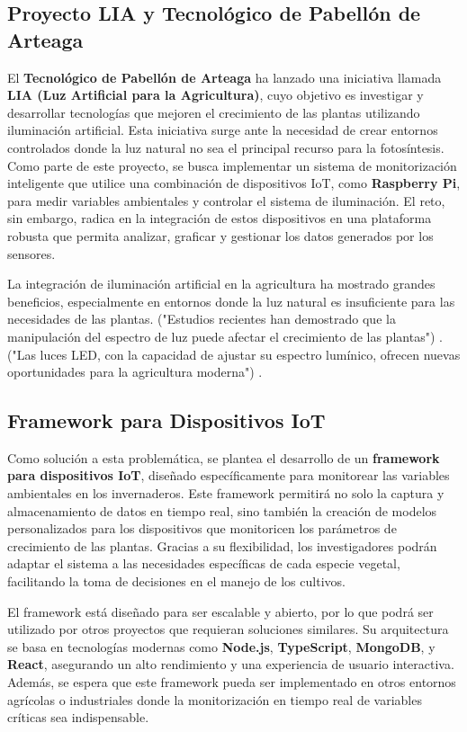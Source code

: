 \subsection{Proyecto LIA y Tecnológico de Pabellón de Arteaga}
El \textbf{Tecnológico de Pabellón de Arteaga} ha lanzado una iniciativa llamada \textbf{LIA (Luz Artificial para la Agricultura)}, cuyo objetivo es investigar y desarrollar tecnologías que mejoren el crecimiento de las plantas utilizando iluminación artificial. Esta iniciativa surge ante la necesidad de crear entornos controlados donde la luz natural no sea el principal recurso para la fotosíntesis. Como parte de este proyecto, se busca implementar un sistema de monitorización inteligente que utilice una combinación de dispositivos IoT, como \textbf{Raspberry Pi}, para medir variables ambientales y controlar el sistema de iluminación. El reto, sin embargo, radica en la integración de estos dispositivos en una plataforma robusta que permita analizar, graficar y gestionar los datos generados por los sensores.

La integración de iluminación artificial en la agricultura ha mostrado grandes beneficios, especialmente en entornos donde la luz natural es insuficiente para las necesidades de las plantas. ("Estudios recientes han demostrado que la manipulación del espectro de luz puede afectar el crecimiento de las plantas") \cite{gonzalez2019, zhang2021}. ("Las luces LED, con la capacidad de ajustar su espectro lumínico, ofrecen nuevas oportunidades para la agricultura moderna") \cite{zhang2021}.

\subsection{Framework para Dispositivos IoT}
Como solución a esta problemática, se plantea el desarrollo de un \textbf{framework para dispositivos IoT}, diseñado específicamente para monitorear las variables ambientales en los invernaderos. Este framework permitirá no solo la captura y almacenamiento de datos en tiempo real, sino también la creación de modelos personalizados para los dispositivos que monitoricen los parámetros de crecimiento de las plantas. Gracias a su flexibilidad, los investigadores podrán adaptar el sistema a las necesidades específicas de cada especie vegetal, facilitando la toma de decisiones en el manejo de los cultivos.

El framework está diseñado para ser escalable y abierto, por lo que podrá ser utilizado por otros proyectos que requieran soluciones similares. Su arquitectura se basa en tecnologías modernas como \textbf{Node.js}, \textbf{TypeScript}, \textbf{MongoDB}, y \textbf{React}, asegurando un alto rendimiento y una experiencia de usuario interactiva. Además, se espera que este framework pueda ser implementado en otros entornos agrícolas o industriales donde la monitorización en tiempo real de variables críticas sea indispensable.


